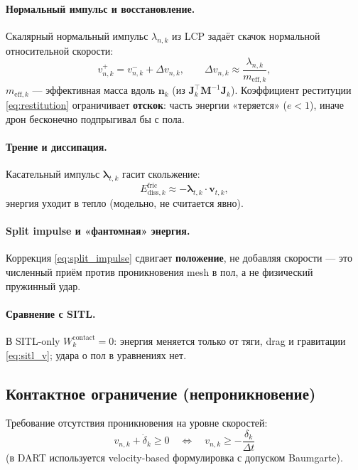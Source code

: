 \documentclass[a4paper,11pt]{article}
\newcommand{\vect}[1]{\bm{#1}}
\newcommand{\mat}[1]{\bm{#1}}
\begin{document}
\paragraph{Нормальный импульс и восстановление.}
Скалярный нормальный импульс $\lambda_{n,k}$ из LCP задаёт скачок
нормальной относительной скорости:
\begin{equation}
  v_{n,k}^{+} = v_{n,k}^{-} + \Delta v_{n,k},
  \qquad
  \Delta v_{n,k} \approx \frac{\lambda_{n,k}}{m_{\mathrm{eff},k}},
  \label{eq:impulse_normal}
\end{equation}
$m_{\mathrm{eff},k}$ --- эффективная масса вдоль $\vect{n}_k$
(из $\vect{J}_k^\top \mat{M}^{-1}\vect{J}_k$).
Коэффициент реституции \eqref{eq:restitution} ограничивает
\textbf{отскок}: часть энергии «теряется» ($e<1$), иначе дрон
бесконечно подпрыгивал бы с пола.

\paragraph{Трение и диссипация.}
Касательный импульс $\vect{\lambda}_{t,k}$ гасит скольжение:
\begin{equation}
  E_{\mathrm{diss},k}^{\mathrm{fric}} \approx
  -\vect{\lambda}_{t,k} \cdot \vect{v}_{t,k},
  \label{eq:fric_diss}
\end{equation}
энергия уходит в тепло (модельно, не считается явно).

\paragraph{Split impulse и «фантомная» энергия.}
Коррекция \eqref{eq:split_impulse} сдвигает \textbf{положение},
не добавляя скорости --- это численный приём против проникновения mesh
в пол, а не физический пружинный удар.

\paragraph{Сравнение с SITL.}
В SITL-only $W_k^{\mathrm{contact}} = 0$: энергия меняется только
от тяги, drag и гравитации \eqref{eq:sitl_v}; удара о пол в уравнениях нет.

\subsection{Контактное ограничение (непроникновение)}

Требование отсутствия проникновения на уровне скоростей:
\begin{equation}
  v_{n,k} + \dot{\delta}_k \geq 0
  \quad\Leftrightarrow\quad
  v_{n,k} \geq -\frac{\delta_k}{\Delta t}
  \label{eq:nonpenetration}
\end{equation}
(в DART используется velocity-based формулировка с допуском Baumgarte).
\end{document}
